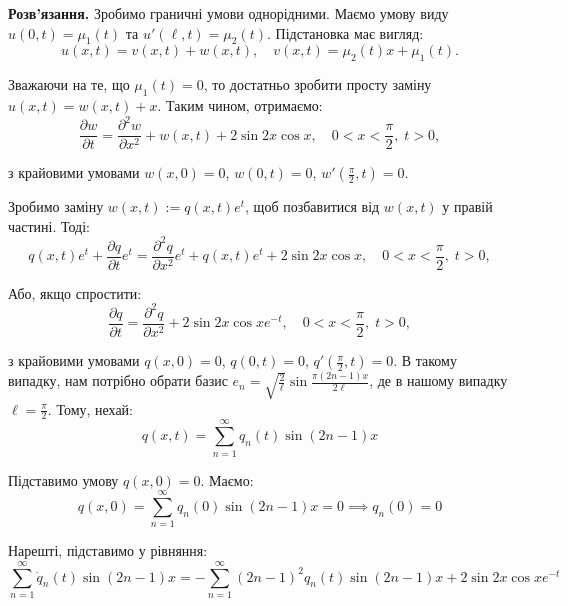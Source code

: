\documentclass{hw_template}
\begin{document}
\textbf{Розв'язання.} Зробимо граничні умови однорідними. Маємо умову виду 
$u(0,t)=\mu_1(t)$ та $u'(\ell,t)=\mu_2(t)$. Підстановка має вигляд:
\begin{equation*}
    u(x,t) = v(x,t) + w(x,t), \quad v(x,t) = \mu_2(t)x + \mu_1(t).
\end{equation*}

Зважаючи на те, що $\mu_1(t)=0$, то достатньо зробити просту заміну 
$u(x,t) = w(x,t) + x$. Таким чином, отримаємо:
\begin{equation*}
    \frac{\partial w}{\partial t} = \frac{\partial^2 w}{\partial x^2} + w(x,t) + 2 \sin 2x \cos x, \quad 0 < x < \frac{\pi}{2},\; t > 0,
\end{equation*}

з крайовими умовами $w(x,0)=0$, $w(0,t)=0$, $w'(\frac{\pi}{2},t) = 0$.

Зробимо заміну $w(x,t) := q(x,t)e^{t}$, щоб позбавитися від $w(x,t)$ у правій частині. Тоді:
\begin{equation*}
    q(x,t)e^t + \frac{\partial q}{\partial t}e^t = \frac{\partial^2 q}{\partial x^2}e^t + q(x,t)e^t + 2 \sin 2x \cos x, \quad 0 < x < \frac{\pi}{2},\; t > 0,
\end{equation*}

Або, якщо спростити:
\begin{equation*}
    \frac{\partial q}{\partial t} = \frac{\partial^2 q}{\partial x^2} + 2 \sin 2x \cos x e^{-t}, \quad 0 < x < \frac{\pi}{2},\; t > 0,
\end{equation*}

з крайовими умовами $q(x,0)=0$, $q(0,t)=0$, $q'(\frac{\pi}{2},t) = 0$. В такому випадку, нам 
потрібно обрати базис $e_n = \sqrt{\frac{2}{\ell}}\sin \frac{\pi (2n-1)x}{2\ell}$, де в нашому 
випадку $\ell = \frac{\pi}{2}$. Тому, нехай:
\begin{equation*}
    q(x,t) = \sum_{n=1}^{\infty}q_n(t)\sin(2n-1)x
\end{equation*}

Підставимо умову $q(x,0)=0$. Маємо:
\begin{equation*}
    q(x,0) = \sum_{n=1}^{\infty}q_n(0)\sin(2n-1)x = 0 \implies q_n(0) = 0
\end{equation*}

Нарешті, підставимо у рівняння:
\begin{equation*}
    \sum_{n=1}^{\infty}\dot{q}_n(t)\sin(2n-1)x = -\sum_{n=1}^{\infty}(2n-1)^2q_n(t) \sin (2n-1)x + 2 \sin 2x \cos x e^{-t}
\end{equation*}
\end{document}
